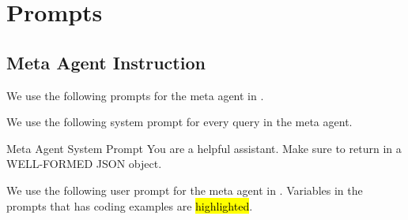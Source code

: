 \clearpage
\section{Prompts}
\label{appx: prompts}
\subsection{Meta Agent Instruction}
\label{appx: meta agent instruction}
We use the following prompts for the meta agent in \method.

We use the following system prompt for every query in the meta agent.
\begin{mybox}{Meta Agent System Prompt}
You are a helpful assistant. Make sure to return in a WELL-FORMED JSON object.
\end{mybox}
We use the following user prompt for the meta agent in \method. Variables in the prompts that has coding examples are \hl{highlighted}.
